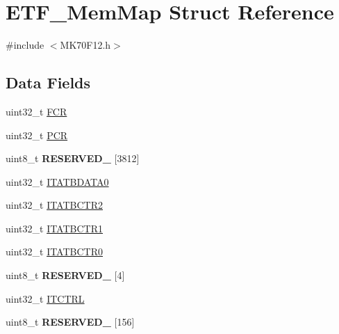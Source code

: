 \hypertarget{struct_e_t_f___mem_map}{}\section{E\+T\+F\+\_\+\+Mem\+Map Struct Reference}
\label{struct_e_t_f___mem_map}


{\ttfamily \#include $<$M\+K70\+F12.\+h$>$}

\subsection*{Data Fields}
\begin{DoxyCompactItemize}
\item 
uint32\+\_\+t \hyperlink{struct_e_t_f___mem_map_ad893993c7fca4a17b0e50d48283dc8a4}{F\+C\+R}
\item 
uint32\+\_\+t \hyperlink{struct_e_t_f___mem_map_aa50938e7ba3b91d0bc8417397ef82267}{P\+C\+R}
\item 
\hypertarget{struct_e_t_f___mem_map_a5c1c16f3f002fbc3cb5f2264844bc692}{}uint8\+\_\+t {\bfseries R\+E\+S\+E\+R\+V\+E\+D\+\_} \mbox{[}3812\mbox{]}\label{struct_e_t_f___mem_map_a5c1c16f3f002fbc3cb5f2264844bc692}

\item 
uint32\+\_\+t \hyperlink{struct_e_t_f___mem_map_ab9991b5782efe3ff465d49f40ed0bbfa}{I\+T\+A\+T\+B\+D\+A\+T\+A0}
\item 
uint32\+\_\+t \hyperlink{struct_e_t_f___mem_map_ab6920fa131f508ff5a9b6817be95bed5}{I\+T\+A\+T\+B\+C\+T\+R2}
\item 
uint32\+\_\+t \hyperlink{struct_e_t_f___mem_map_a43cd2057b8fcb847375a18e4638f923e}{I\+T\+A\+T\+B\+C\+T\+R1}
\item 
uint32\+\_\+t \hyperlink{struct_e_t_f___mem_map_a25f602259e8235c0a7d5a95d27a0ad8d}{I\+T\+A\+T\+B\+C\+T\+R0}
\item 
\hypertarget{struct_e_t_f___mem_map_a2951877523cf3492cf40b3dd1542043c}{}uint8\+\_\+t {\bfseries R\+E\+S\+E\+R\+V\+E\+D\+\_} \mbox{[}4\mbox{]}\label{struct_e_t_f___mem_map_a2951877523cf3492cf40b3dd1542043c}

\item 
uint32\+\_\+t \hyperlink{struct_e_t_f___mem_map_a287d5070161434a42360e126bd310a1a}{I\+T\+C\+T\+R\+L}
\item 
\hypertarget{struct_e_t_f___mem_map_a5f1bd0e51482e5fab2c10a3f115fdb02}{}uint8\+\_\+t {\bfseries R\+E\+S\+E\+R\+V\+E\+D\+\_} \mbox{[}156\mbox{]}\label{struct_e_t_f___mem_map_a5f1bd0e51482e5fab2c10a3f115fdb02}


\end{DoxyCompactItemize}
